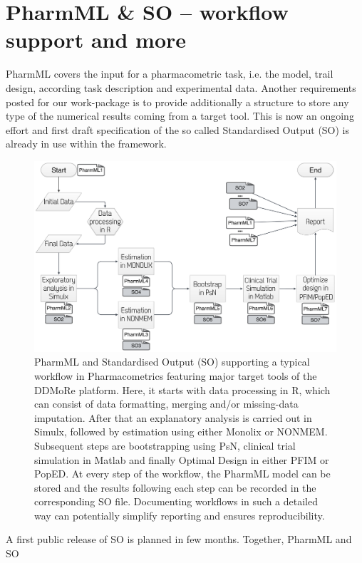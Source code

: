 \section{PharmML \& SO -- workflow support and more}
\label{intro:workflows}
PharmML covers the input for a pharmacometric task, i.e. the model, trail design, 
according task description and experimental data. Another requirements 
posted for our work-package is to provide additionally a structure to store any type
of the numerical results coming from a target tool. This is now an ongoing 
effort and first draft specification of the so called Standardised Output (SO)
is already in use within the framework. 

\begin{figure}[ht!]
\centering
  \includegraphics[width=0.95\linewidth]{pics/workflowPharmMLSO}
 \caption{PharmML and Standardised Output (SO) supporting a typical 
 workflow in Pharmacometrics featuring major target tools of the DDMoRe 
 platform. Here, it starts with data processing in R, which can consist of data 
 formatting, merging and/or missing-data imputation. After that an explanatory 
 analysis is carried out in Simulx, followed by estimation using either Monolix 
 or NONMEM. Subsequent steps are bootstrapping using PsN, clinical trial 
 simulation in Matlab and finally Optimal Design in either PFIM or PopED. 
 At every step of the workflow, the PharmML model can be stored and the 
 results following each step can be recorded in the corresponding SO file. 
 Documenting workflows in such a detailed way can potentially simplify 
 reporting and ensures reproducibility.}
 \label{fig:workflowPharmMLSO}
\end{figure}
A first public release of SO is planned in few months. Together, PharmML and SO 
